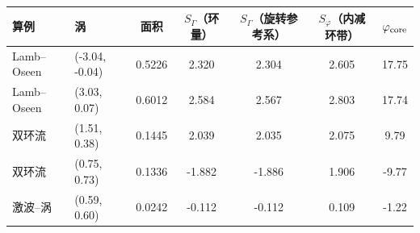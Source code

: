 \begin{tabular}{llccccc}\toprule 算例 & 涡 & 面积 & $S_\Gamma$（环量） & $S_\Gamma$（旋转参考系） & $S_\varphi$（内减环带） & $\varphi_{\rm core}$\\\midrule
Lamb–Oseen & (-3.04, -0.04) & 0.5226 & 2.320 & 2.304 & 2.605 & 17.75\\
Lamb–Oseen & (3.03, 0.07) & 0.6012 & 2.584 & 2.567 & 2.803 & 17.74\\
双环流 & (1.51, 0.38) & 0.1445 & 2.039 & 2.035 & 2.075 & 9.79\\
双环流 & (0.75, 0.73) & 0.1336 & -1.882 & -1.886 & 1.906 & -9.77\\
激波–涡 & (0.59, 0.60) & 0.0242 & -0.112 & -0.112 & 0.109 & -1.22\\
\bottomrule\end{tabular}